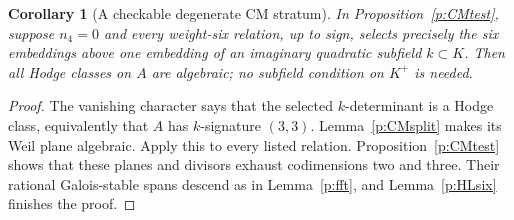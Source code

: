 \documentclass[11pt,reqno]{article}
\theoremstyle{emphasizedplain}
\newtheorem{corollary}[theorem]{Corollary}
\theoremstyle{emphasizeddefinition}
\theoremstyle{emphasizeddefinition}
\begin{document}
\begin{corollary}[A checkable degenerate CM stratum]\label{p:CMquartic}
In Proposition~\ref{p:CMtest}, suppose $n_4=0$ and every weight-six
relation, up to sign, selects precisely the six embeddings above one
embedding of an imaginary quadratic subfield $k\subset K$.
Then all Hodge classes on $A$ are algebraic; no subfield condition
on $K^+$ is needed.
\end{corollary}
\begin{proof}
The vanishing character says that the selected $k$-determinant is a
Hodge class, equivalently that $A$ has $k$-signature $(3,3)$.
Lemma~\ref{p:CMsplit} makes its Weil plane algebraic. Apply this
to every listed relation. Proposition~\ref{p:CMtest} shows that these
planes and divisors exhaust codimensions two and three. Their rational
Galois-stable spans descend as in Lemma~\ref{p:fft}, and
Lemma~\ref{p:HLsix} finishes the proof.
\end{proof}
\end{document}

